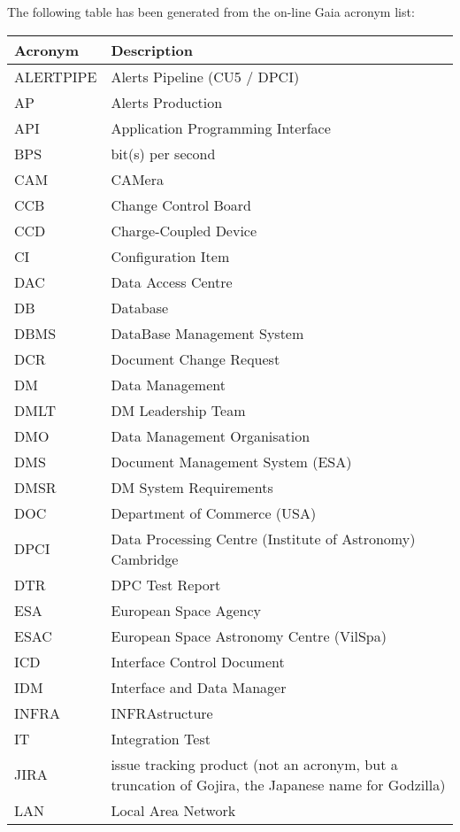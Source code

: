 The following table has been generated from the on-line Gaia acronym list:
\newline\newline%
\addtocounter{table}{-1}
\begin{longtable}{|l|p{}|}\hline 
\textbf{Acronym} & \textbf{Description}  \\\hline
ALERTPIPE&Alerts Pipeline (CU5 / DPCI) \\\hline
AP&Alerts Production \\\hline
API&Application Programming Interface \\\hline
BPS&bit(s) per second \\\hline
CAM&CAMera \\\hline
CCB&Change Control Board \\\hline
CCD&Charge-Coupled Device \\\hline
CI&Configuration Item \\\hline
DAC&Data Access Centre \\\hline
DB&Database \\\hline
DBMS&DataBase Management System \\\hline
DCR&Document Change Request \\\hline
DM&Data Management \\\hline
DMLT&DM Leadership Team \\\hline
DMO&Data Management Organisation \\\hline
DMS&Document Management System (ESA) \\\hline
DMSR&DM System Requirements \\\hline
DOC&Department of Commerce (USA) \\\hline
DPCI&Data Processing Centre (Institute of Astronomy) Cambridge \\\hline
DTR&DPC Test Report \\\hline
ESA&European Space Agency \\\hline
ESAC&European Space Astronomy Centre (VilSpa) \\\hline
ICD&Interface Control Document \\\hline
IDM&Interface and Data Manager \\\hline
INFRA&INFRAstructure \\\hline
IT&Integration Test \\\hline
JIRA&issue tracking product (not an acronym, but a truncation of Gojira, the Japanese name for Godzilla) \\\hline
LAN&Local Area Network \\\hline

\end{longtable}

